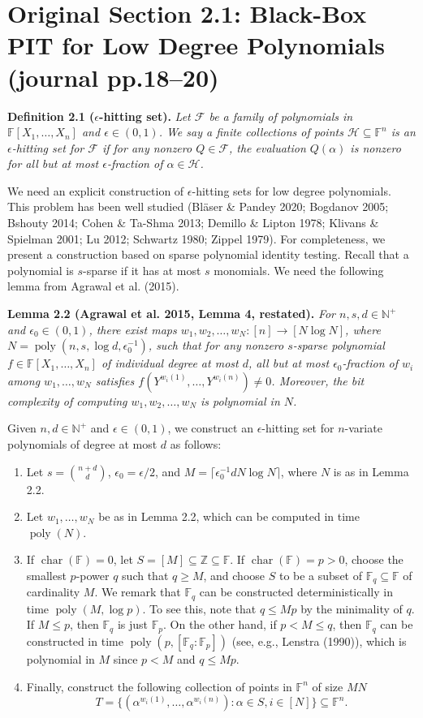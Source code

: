 \documentclass[10pt,a4paper]{article}
\newcommand{\FF}{\mathbb F}
\newenvironment{result}[1]{\par\medskip\noindent\textbf{#1.}\itshape}{\par\medskip}
\begin{document}
\section*{Original Section 2.1: Black-Box PIT for Low Degree Polynomials (journal pp.18--20)}
\begin{result}{Definition 2.1 ($\epsilon$-hitting set)}
Let $\mathcal F$ be a family of polynomials in $\FF[X_1,\ldots,X_n]$ and $\epsilon\in(0,1)$. We say a finite collections of points $\mathcal H\subseteq\FF^n$ is an $\epsilon$-hitting set for $\mathcal F$ if for any nonzero $Q\in\mathcal F$, the evaluation $Q(\alpha)$ is nonzero for all but at most $\epsilon$-fraction of $\alpha\in\mathcal H$.
\end{result}
We need an explicit construction of $\epsilon$-hitting sets for low degree polynomials. This problem has been well studied (Bl\"aser \& Pandey 2020; Bogdanov 2005; Bshouty 2014; Cohen \& Ta-Shma 2013; Demillo \& Lipton 1978; Klivans \& Spielman 2001; Lu 2012; Schwartz 1980; Zippel 1979). For completeness, we present a construction based on sparse polynomial identity testing.
Recall that a polynomial is $s$-sparse if it has at most $s$ monomials. We need the following lemma from Agrawal et al. (2015).
\begin{result}{Lemma 2.2 (Agrawal et al. 2015, Lemma 4, restated)}
For $n,s,d\in\mathbb N^+$ and $\epsilon_0\in(0,1)$, there exist maps $w_1,w_2,\ldots,w_N:[n]\to[N\log N]$, where $N=\operatorname{poly}(n,s,\log d,\epsilon_0^{-1})$, such that for any nonzero $s$-sparse polynomial $f\in\FF[X_1,\ldots,X_n]$ of individual degree at most $d$, all but at most $\epsilon_0$-fraction of $w_i$ among $w_1,\ldots,w_N$ satisfies $f(Y^{w_i(1)},\ldots,Y^{w_i(n)})\ne0$. Moreover, the bit complexity of computing $w_1,w_2,\ldots,w_N$ is polynomial in $N$.
\end{result}
Given $n,d\in\mathbb N^+$ and $\epsilon\in(0,1)$, we construct an $\epsilon$-hitting set for $n$-variate polynomials of degree at most $d$ as follows:
\begin{enumerate}
\item Let $s=\binom{n+d}{d}$, $\epsilon_0=\epsilon/2$, and $M=\lceil\epsilon_0^{-1}dN\log N\rceil$, where $N$ is as in Lemma 2.2.
\item Let $w_1,\ldots,w_N$ be as in Lemma 2.2, which can be computed in time $\operatorname{poly}(N)$.
\item If $\operatorname{char}(\FF)=0$, let $S=[M]\subseteq\mathbb Z\subseteq\FF$. If $\operatorname{char}(\FF)=p>0$, choose the smallest $p$-power $q$ such that $q\ge M$, and choose $S$ to be a subset of $\FF_q\subseteq\FF$ of cardinality $M$. We remark that $\FF_q$ can be constructed deterministically in time $\operatorname{poly}(M,\log p)$. To see this, note that $q\le Mp$ by the minimality of $q$. If $M\le p$, then $\FF_q$ is just $\FF_p$. On the other hand, if $p<M\le q$, then $\FF_q$ can be constructed in time $\operatorname{poly}(p,[\FF_q:\FF_p])$ (see, e.g., Lenstra (1990)), which is polynomial in $M$ since $p<M$ and $q\le Mp$.
\item Finally, construct the following collection of points in $\FF^n$ of size $MN$
\[T=\{(\alpha^{w_i(1)},\ldots,\alpha^{w_i(n)}):\alpha\in S,i\in[N]\}\subseteq\FF^n.\]
\end{enumerate}
\end{document}

